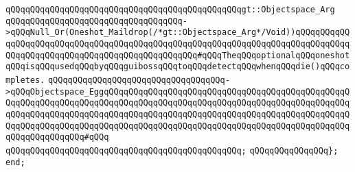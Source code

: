 \verb|qQQqqQQqqQQqqQQqqQQqqQQqqQQqqQQqqQQqqQQqqQQqqQQqgt::Objectspace_Arg|\newline
\verb|qQQqqQQqqQQqqQQqqQQqqQQqqQQqqQQqqQQq->qQQqNull_Or(Oneshot_Maildrop(/*gt::Objectspace_Arg*/Void))qQQqqQQqqQQqqQQqqQQqqQQqqQQqqQQqqQQqqQQqqQQqqQQqqQQqqQQqqQQqqQQqqQQqqQQqqQQqqQQqqQQqqQQqqQQqqQQqqQQqqQQqqQQqqQQqqQQqqQQq#qQQqTheqQQqoptionalqQQqoneshotqQQqisqQQqusedqQQqbyqQQqguibossqQQqtoqQQqdetectqQQqwhenqQQqdie()qQQqcompletes.|\newline
\verb|qQQqqQQqqQQqqQQqqQQqqQQqqQQqqQQqqQQq->qQQqObjectspace_EggqQQqqQQqqQQqqQQqqQQqqQQqqQQqqQQqqQQqqQQqqQQqqQQqqQQqqQQqqQQqqQQqqQQqqQQqqQQqqQQqqQQqqQQqqQQqqQQqqQQqqQQqqQQqqQQqqQQqqQQqqQQqqQQqqQQqqQQqqQQqqQQqqQQqqQQqqQQqqQQqqQQqqQQqqQQqqQQqqQQqqQQqqQQqqQQqqQQqqQQqqQQqqQQqqQQqqQQqqQQqqQQqqQQqqQQqqQQqqQQqqQQqqQQqqQQqqQQqqQQqqQQqqQQqqQQqqQQq#qQQq|\newline
\verb|qQQqqQQqqQQqqQQqqQQqqQQqqQQqqQQqqQQqqQQqqQQqqQQq;|\newline
\verb|qQQqqQQqqQQqqQQq};|\newline
\newline
\verb|end;|\newline

